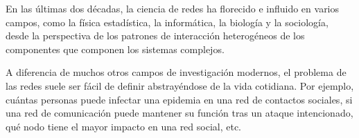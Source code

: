 En las últimas dos décadas, la ciencia de redes ha florecido e influido en varios campos, como la física estadística, la informática, la biología y la sociología, desde la perspectiva de los patrones de interacción heterogéneos de los componentes que componen los sistemas complejos.


A  diferencia de muchos otros campos de investigación modernos, el problema de las redes suele ser fácil de definir abstrayéndose de la vida cotidiana. Por ejemplo, cuántas personas puede infectar una epidemia en una red de contactos sociales, si una red de comunicación puede mantener su función tras un ataque intencionado, qué nodo tiene el mayor impacto en una red social, etc. 

